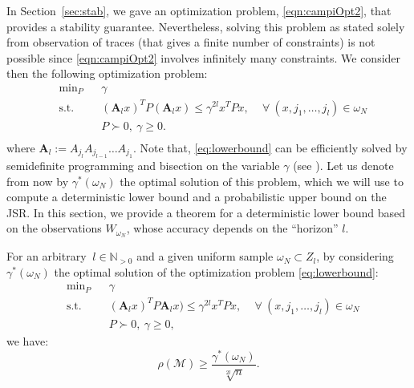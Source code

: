 In Section~\ref{sec:stab}, we gave an optimization problem, \eqref{eqn:campiOpt2}, that provides a stability guarantee. Nevertheless, solving this problem as stated solely from observation of traces (that gives a finite number of constraints) is not possible since \eqref{eqn:campiOpt2} involves infinitely many constraints. We consider then the following optimization problem:
\begin{equation}\label{eq:lowerbound}
\begin{aligned}
& \text{min}_P & & \gamma \\
& \text{s.t.} 
&  & (\mathbf{A}_l x)^T P (\mathbf{A}_l x) \leq \gamma^{2l} x^T P x, \,  \quad \forall\ (x, j_1,\dots, j_l) \in \omega_N\\
& && P \succ 0,\ \gamma \geq 0. \\
\end{aligned}
\end{equation}
where $\mathbf{A}_l :=  A_{j_l} A_{j_{l-1}} \dots A_{j_1}$.
Note that, \eqref{eq:lowerbound} can be efficiently solved by semidefinite programming and bisection on the variable $\gamma$ (see \cite{boyd}). Let us denote from now by $\gamma^*(\omega_N)$ the optimal solution of this problem, which we will use to compute a deterministic lower bound and a probabilistic upper bound on the JSR. In this section, we provide a theorem for a deterministic lower bound based on the observations $W_{\omega_N}$, whose accuracy depends on the ``horizon'' $l$.
\begin{thm}\label{thm:lowerbound}
For an arbitrary $\ l \in \mathbb{N}_{>0}$ and a given uniform sample $\omega_N \subset Z_l$, by considering $\gamma^*(\omega_N)$ the optimal solution of the optimization problem \eqref{eq:lowerbound}:
\begin{equation*}
\begin{aligned}
& \text{min}_P & & \gamma \\
& \text{s.t.} 
&  & (\mathbf{A}_l x)^T P \mathbf{A}_l x) \leq \gamma^{2l} x^T P x, \,  \quad \forall\ (x, j_1,\dots, j_l) \in \omega_N\\
& && P \succ 0,\ \gamma \geq 0,
\end{aligned}
\end{equation*}
we have:
$$\rho(\mathcal{M}) \geq \frac{\gamma^*(\omega_N)}{\sqrt[2l]{n}}.$$ 
\end{thm}
